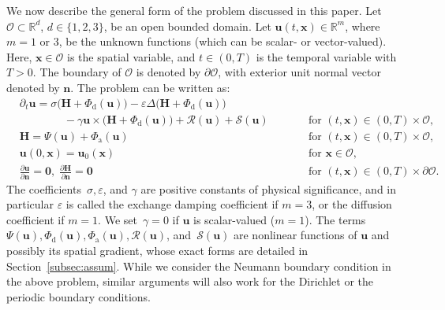 \documentclass[11pt, reqno]{amsart}
\theoremstyle{definition}
\numberwithin{equation}{section}
\newcommand{\bff}{\boldsymbol}
\newcommand{\bb}{\mathbb}
\begin{document}
We now describe the general form of the problem discussed in this paper. Let $\mathscr{O} \subset \bb{R}^d$, $d\in \{1,2,3\}$, be an open bounded domain. Let $\bff{u}(t,\bff{x})\in \bb{R}^m$, where $m=1$ or $3$, be the unknown functions (which can be scalar- or vector-valued). Here, $\bff{x}\in \mathscr{O}$ is the spatial variable, and $t\in (0,T)$ is the temporal variable with $T>0$. The boundary of $\mathscr{O}$ is denoted by $\partial\mathscr{O}$, with exterior unit normal vector denoted by $\bff{n}$. The problem can be written as:
\begin{subequations}\label{equ:llbar}
	\begin{alignat}{2}
		&\partial_t \bff{u}
		= 
		\sigma \big(\bff{H}+\Phi_{\mathrm{d}}(\bff{u})\big)
		- \varepsilon \Delta \big(\bff{H}+\Phi_{\mathrm{d}}(\bff{u})\big) 
		&&
		\nonumber \\
		\label{equ:llbar a}
		&\qquad\qquad
		- \gamma \bff{u} \times \big(\bff{H}+\Phi_{\mathrm{d}}(\bff{u})\big)
		+ \mathcal{R}(\bff{u})
		+ \mathcal{S}(\bff{u})
		&&\qquad  \text{for $(t,\bff{x})\in(0,T)\times\mathscr{O}$,}
		\\[1ex]
		\label{equ:llbar b}
		&\bff{H}
		= 
		\Psi(\bff{u})
		+ \Phi_{\mathrm{a}}(\bff{u})
		&&\qquad \text{for $(t,\bff{x})\in(0,T)\times\mathscr{O}$,}
		\\[1ex]
		\label{equ:llbar c}
		&\bff{u}(0,\bff{x})= \bff{u}_0(\bff{x}) 
		&&\qquad \text{for } \bff{x}\in \mathscr{O},
		\\[1ex]
		\label{equ:llbar d}
		&\displaystyle{
			\frac{\partial \bff{u}}{\partial \bff{n}}= \bff{0}}, 
		\;\displaystyle{\frac{\partial \bff{H}}{\partial \bff{n}}= \bff{0}} 
		&&\qquad \text{for } (t,\bff{x})\in (0,T) \times \partial \mathscr{O}.
	\end{alignat}
\end{subequations}
The coefficients~$\sigma, \varepsilon$, and $\gamma$ are positive constants of physical significance, and in particular $\varepsilon$ is called the exchange damping coefficient if $m=3$, or the diffusion coefficient if $m=1$. We set~$\gamma=0$ if $\bff{u}$ is scalar-valued ($m=1$). The terms~$\Psi(\bff{u}), \Phi_{\mathrm{d}}(\bff{u}), \Phi_{\mathrm{a}}(\bff{u}), \mathcal{R}(\bff{u})$, and~$\mathcal{S}(\bff{u})$ are nonlinear functions of $\bff{u}$ and possibly its spatial gradient, whose exact forms are detailed in Section~\ref{subsec:assum}. While we consider the Neumann boundary condition in the above problem, similar arguments will also work for the Dirichlet or the periodic boundary conditions.
\end{document}
